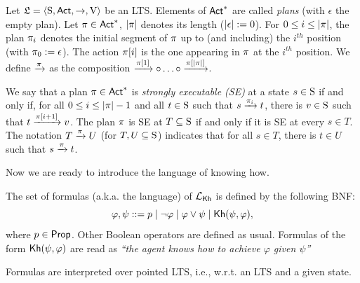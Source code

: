 \begin{definition}\label{def:plans}
    Let $\model=\tup{\S,\ACT,\ra,\V}$ be an LTS. 
    Elements of $\ACT^*$ are called \emph{plans} (with $\epsilon$ the empty plan).  Let $\plan\in\ACT^*$, $\size{\plan}$ denotes its length ($\size{\epsilon}:=0$).
    For  $0\leq i \leq \size{\plan}$, the plan $\plan_i$ denotes the initial segment of $\plan$ up to (and including) the $i^{th}$ position (with $\plan_0 := \epsilon$). The action $\plan[i]$ is the one appearing in $\plan$ at the $i^{th}$ position. We define $\reach{\plan}$ as the composition $\reach{\plan[1]} \comp \ldots \comp \reach{\plan[\size{\plan}]}$. 

    We say that a plan $\plan\in\ACT^*$ is \emph{strongly executable (SE)} at a state $s\in\S$ if and only if, for all $0\leq i \leq \size{\plan}-1$ and all $t\in\S$ such that $s\reach{\plan_i} t$, there is $v\in\S$ such that $t\reach{\plan[i+1]} v$. The plan $\plan$ is SE at $T\subseteq \S$ if and only if it is SE at every $s\in T$. The notation $T \reach{\plan} U$ (for $T,U\subseteq\S$) indicates that for all $s\in T$, there is $t\in U$ such that $s\reach{\plan} t$.
\end{definition}

Now we are ready to introduce the language of knowing how.

\begin{definition}
    \label{def:syntax}
    The set of formulas (a.k.a. the language) of $\Khlogic$ is defined by the following BNF:
    \[
        \varphi, \psi ::= p \mid \neg \varphi \mid \varphi \vee \psi \mid \kh(\psi,\varphi),
    \]
    where $p\in\PROP$. Other Boolean operators are defined as usual. Formulas of the form $\kh(\psi,\varphi)$ are read as \emph{``the agent knows how to achieve $\varphi$ given $\psi$''}
\end{definition}

Formulas are interpreted over pointed LTS, i.e., w.r.t. an LTS and a given state. 

